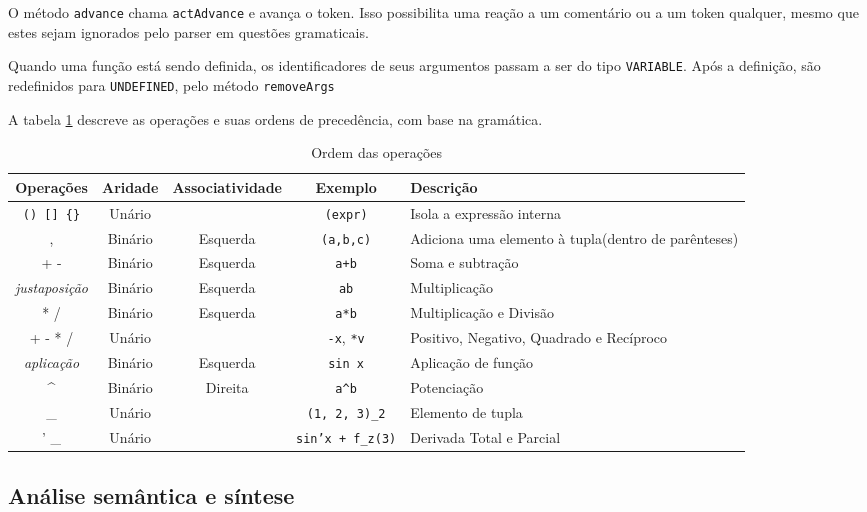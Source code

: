 O método \texttt{advance} chama \texttt{actAdvance} e avança o token.
Isso possibilita uma reação a um comentário ou a um token qualquer,
mesmo que estes sejam ignorados pelo parser em questões gramaticais.

Quando uma função está sendo definida, os identificadores de seus argumentos
passam a ser do tipo \texttt{VARIABLE}.
Após a definição, são redefinidos para \texttt{UNDEFINED}, pelo método \texttt{removeArgs}

A tabela \ref{order} descreve as operações e suas ordens de precedência, com base na gramática.

\begin{table}[ht]
\caption{Ordem das operações}
\label{order}
\begin{centering}
\begin{tabularx}{\textwidth}{||c|c|c|c|X||}
    \cline{1-5}
    Operações & Aridade & Associatividade & Exemplo & Descrição \\ \hline \hline

    \texttt{() [] \{\}} & Unário &  & \texttt{(expr)} & Isola a expressão interna \\ \hline
    , & Binário & Esquerda & \texttt{(a,b,c)} & Adiciona uma elemento à tupla(dentro de parênteses) \\ \hline
    + - & Binário & Esquerda & \texttt{a+b} & Soma e subtração \\ \hline
    \textit{justaposição} & Binário & Esquerda & \texttt{ab} & Multiplicação \\ \hline
    * / & Binário & Esquerda & \texttt{a*b} & Multiplicação e Divisão \\ \hline
    + - * / & Unário &  & \texttt{-x}, \texttt{*v} & Positivo, Negativo, Quadrado e Recíproco \\ \hline
    \textit{aplicação} & Binário & Esquerda & \texttt{sin x} & Aplicação de função \\ \hline
    \textasciicircum & Binário & Direita & \texttt{a\textasciicircum b} & Potenciação \\ \hline
    \_ & Unário & & \texttt{(1, 2, 3)\_2} & Elemento de tupla \\ \hline
    ' \_ & Unário & & \texttt{sin'x + f\_z(3)} & Derivada Total e Parcial \\ \hline
    \cline{1-5}
\end{tabularx}
\end{centering}
\end{table}

\subsection{Análise semântica e síntese}

